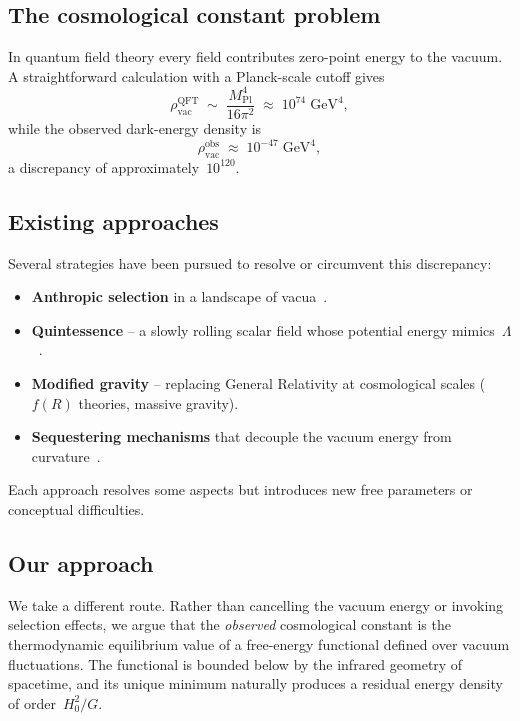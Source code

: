 \documentclass[12pt,a4paper]{article}
\theoremstyle{definition}
\theoremstyle{plain}
\theoremstyle{remark}
\newcommand{\rhov}{\rho_{\mathrm{vac}}}
\begin{document}
\subsection{The cosmological constant problem}

In quantum field theory every field contributes zero-point energy to the
vacuum. A straightforward calculation with a Planck-scale cutoff
gives~\cite{Weinberg1989,Zeldovich1968}
\begin{equation}\label{eq:qft-estimate}
  \rhov^{\mathrm{QFT}} \;\sim\; \frac{M_{\mathrm{Pl}}^{4}}{16\pi^{2}}
  \;\approx\; 10^{74}\;\mathrm{GeV}^{4},
\end{equation}
while the observed dark-energy density is
\begin{equation}\label{eq:obs}
  \rhov^{\mathrm{obs}} \;\approx\; 10^{-47}\;\mathrm{GeV}^{4},
\end{equation}
a discrepancy of approximately~$10^{120}$.

\subsection{Existing approaches}

Several strategies have been pursued to resolve or circumvent this
discrepancy:
\begin{itemize}
  \item \textbf{Anthropic selection} in a landscape of
        vacua~\cite{BoussoPolchinski2000,Susskind2003}.
  \item \textbf{Quintessence} -- a slowly rolling scalar field whose
        potential energy mimics~$\Lambda$~\cite{PeeblesRatra2003}.
  \item \textbf{Modified gravity} -- replacing General Relativity at
        cosmological scales ($f(R)$ theories, massive gravity).
  \item \textbf{Sequestering mechanisms} that decouple the vacuum energy
        from curvature~\cite{KaloperPadilla2014}.
\end{itemize}
Each approach resolves some aspects but introduces new free parameters or
conceptual difficulties.

\subsection{Our approach}

We take a different route. Rather than cancelling the vacuum energy or
invoking selection effects, we argue that the \emph{observed}
cosmological constant is the thermodynamic equilibrium value of a
free-energy functional defined over vacuum fluctuations. The functional
is bounded below by the infrared geometry of spacetime, and its unique
minimum naturally produces a residual energy density of
order~$H_0^{2}/G$.
\end{document}
